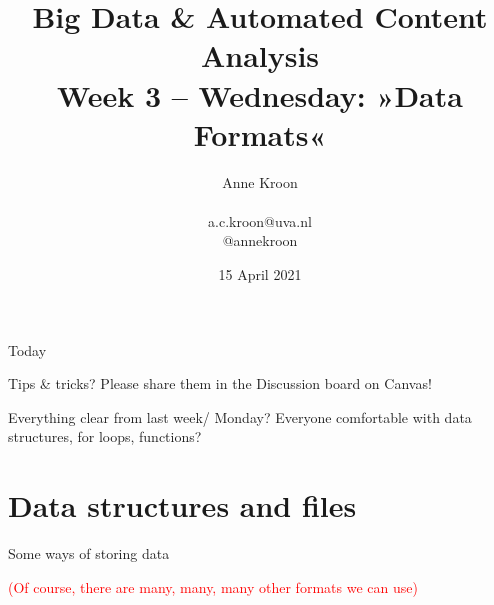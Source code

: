 \documentclass[compress]{beamer}
\title[Big Data and Automated Content Analysis]{\textbf{Big Data \& Automated Content Analysis} \\ Week 3 -- Wednesday: »Data Formats«}
\author[Anne Kroon]{Anne Kroon \\ ~ \\ \footnotesize{a.c.kroon@uva.nl \\@annekroon} }
\date{15 April 2021}
\institute[UvA]{Afdeling Communicatiewetenschap \\Universiteit van Amsterdam}
\begin{document}
\begin{frame}{}
\titlepage
\end{frame}

\begin{frame}{Today}
\tableofcontents
\end{frame}


\begin{frame}[standout]
	Tips \& tricks? Please share them in the Discussion board on Canvas!
\end{frame}


\begin{frame}[standout]
	Everything clear from last week/ Monday? Everyone comfortable with data structures, for loops, functions?
\end{frame}




\section{Data structures and files}


\begin{frame}{Some ways of storing data}
\begin{table}[]
\end{table}
\pause
\textcolor{red}{\footnotesize{(Of course, there are many, many, many other formats we can use)}}
\end{frame}
\end{document}

